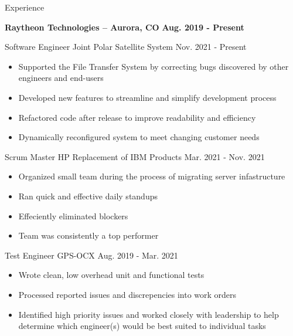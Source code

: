 \documentclass[12pt]{resumeclass}
\begin{document}
\vspace{12pt}
\resumesect
    {Experience}
    {\textbf{\large{Raytheon Technologies -- Aurora, CO}} \hfill \textbf{Aug. 2019 - Present}


    \vspace{3pt}
    \experiencesect
	{Software Engineer}
	{Joint Polar Satellite System}
	{Nov. 2021 - Present}
	{\begin{itemize}[noitemsep,nolistsep]
	    \item Supported the File Transfer System by correcting bugs discovered by other engineers and end-users
	    \item Developed new features to streamline and simplify development process
	    \item Refactored code after release to improve readability and efficiency
	    \item Dynamically reconfigured system to meet changing customer needs
	\end{itemize}}


    \vspace{3pt}
    \experiencesect
	{Scrum Master}
	{HP Replacement of IBM Products}
	{Mar. 2021 - Nov. 2021}
	{\begin{itemize}[noitemsep,nolistsep]
	    \item Organized small team during the process of migrating server infastructure
	    \item Ran quick and effective daily standups
	    \item Effeciently eliminated blockers
	    \item Team was consistently a top performer
	\end{itemize}}


    \vspace{3pt}
    \experiencesect
	{Test Engineer}
	{GPS-OCX}
	{Aug. 2019 - Mar. 2021}
	{\begin{itemize}[noitemsep,nolistsep]
	    \item Wrote clean, low overhead unit and functional tests
	    \item Processed reported issues and discrepencies into work orders
	    \item Identified high priority issues and worked closely with leadership to help determine which engineer(s) would be best suited to individual tasks
	\end{itemize}}}
\end{document}
